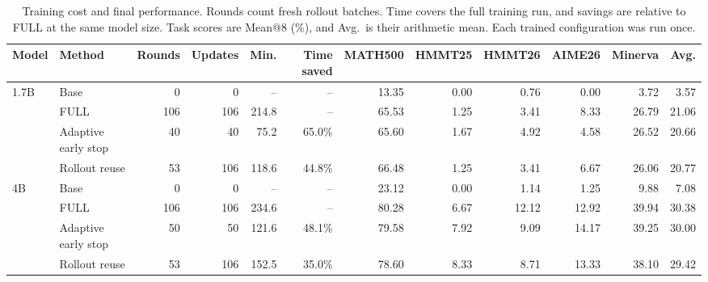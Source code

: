 \begin{table}[t]
\centering
\caption{Training cost and final performance. Rounds count fresh rollout batches. Time covers the full training run, and savings are relative to FULL at the same model size. Task scores are Mean@8 (\%), and Avg.\ is their arithmetic mean. Each trained configuration was run once.}
\label{tab:benchmark_summary}
\scriptsize
\setlength{\tabcolsep}{2.8pt}
\begin{tabular}{@{}llrrrrrrrrrr@{}}
\toprule
Model & Method & Rounds & Updates & Min. & Time saved & MATH500 & HMMT25 & HMMT26 & AIME26 & Minerva & Avg.\\
\midrule
\multirow{4}{*}{1.7B}
 & Base                & 0 & 0 & -- & -- & 13.35 & 0.00 & 0.76 & 0.00 & 3.72 & 3.57\\
 & FULL                & 106 & 106 & 214.8 & -- & 65.53 & 1.25 & 3.41 & 8.33 & 26.79 & 21.06\\
 & Adaptive early stop & 40 & 40 & 75.2 & 65.0\% & 65.60 & 1.67 & 4.92 & 4.58 & 26.52 & 20.66\\
 & Rollout reuse       & 53 & 106 & 118.6 & 44.8\% & 66.48 & 1.25 & 3.41 & 6.67 & 26.06 & 20.77\\
\midrule
\multirow{4}{*}{4B}
 & Base                & 0 & 0 & -- & -- & 23.12 & 0.00 & 1.14 & 1.25 & 9.88 & 7.08\\
 & FULL                & 106 & 106 & 234.6 & -- & 80.28 & 6.67 & 12.12 & 12.92 & 39.94 & 30.38\\
 & Adaptive early stop & 50 & 50 & 121.6 & 48.1\% & 79.58 & 7.92 & 9.09 & 14.17 & 39.25 & 30.00\\
 & Rollout reuse       & 53 & 106 & 152.5 & 35.0\% & 78.60 & 8.33 & 8.71 & 13.33 & 38.10 & 29.42\\
\bottomrule
\end{tabular}
\end{table}
\FloatBarrier
